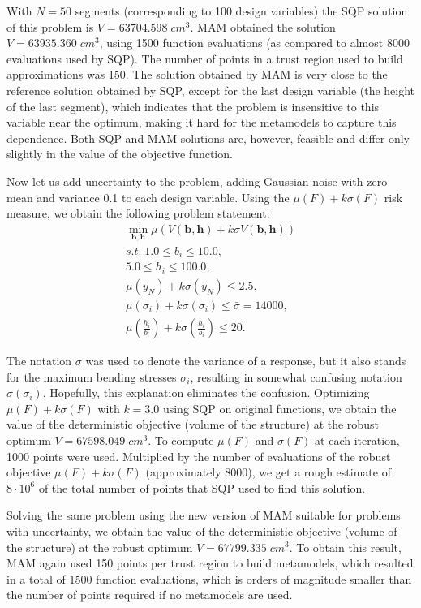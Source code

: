 \documentclass{llncs}
\begin{document}
With $N=50$ segments (corresponding to 100 design variables) the SQP solution of this problem is $V = 63704.598\; cm^3$. MAM obtained the solution $V = 63935.360\; cm^3$, using 1500 function evaluations (as compared to almost 8000 evaluations used by SQP). The number of points in a trust region used to build approximations was 150. The solution obtained by MAM is very close to the reference solution obtained by SQP, except for the last design variable (the height of the last segment), which indicates that the problem is insensitive to this variable near the optimum, making it hard for the metamodels to capture this dependence. Both SQP and MAM solutions are, however, feasible and differ only slightly in the value of the objective function.

Now let us add uncertainty to the problem, adding Gaussian noise with zero mean and variance 0.1 to each design variable. Using the $\mu(F) + k\sigma(F)$ risk measure, we obtain the following problem statement:
\begin{displaymath}
  \begin{array}{c}
    \min\limits_{\pmb b, \pmb h}\mu(V(\pmb b, \pmb h) + k\sigma V(\pmb b, \pmb h)) \\
    s.t.\;1.0\le b_i \le 10.0, \\
    5.0 \le h_i \le 100.0, \\
    \mu(y_N) + k\sigma(y_N)\le 2.5, \\
    \mu(\sigma_i)+k\sigma(\sigma_i)\le \bar{\sigma}=14000, \\
    \mu(\frac{h_i}{b_i})+k\sigma(\frac{h_i}{b_i})\le 20.
  \end{array}
\end{displaymath}

The notation $\sigma$ was used to denote the variance of a response, but it also stands for the maximum bending stresses $\sigma_i$, resulting in somewhat confusing notation $\sigma(\sigma_i )$. Hopefully, this explanation eliminates the confusion. Optimizing $\mu(F) + k\sigma(F)$ with $k = 3.0$ using SQP on original functions, we obtain the value of the deterministic objective (volume of the structure) at the robust optimum $V = 67598.049\; cm^3$. To compute $\mu(F)$ and $\sigma(F)$ at each iteration, 1000 points were used. Multiplied by the number of evaluations of the robust objective $\mu(F) + k\sigma(F)$ (approximately 8000), we get a rough estimate of $8\cdot 10^6$ of the total number of points that SQP used to find this solution.

Solving the same problem using the new version of MAM suitable for problems with uncertainty, we obtain the value of the deterministic objective (volume of the structure) at the robust optimum $V = 67799.335\; cm^3$. To obtain this result, MAM again used 150 points per trust region to build metamodels, which resulted in a total of 1500 function evaluations, which is orders of magnitude smaller than the number of points required if no metamodels are used.
\end{document}
